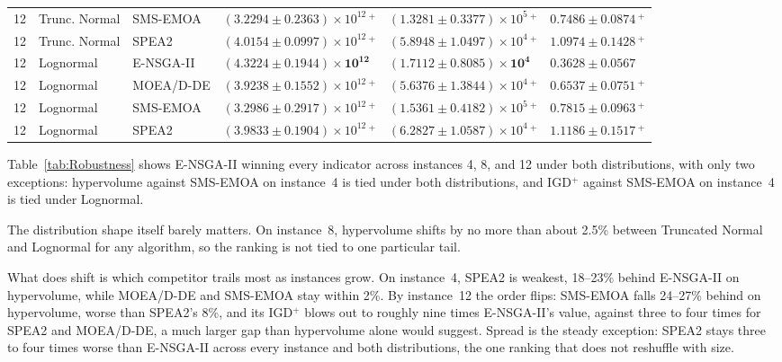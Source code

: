 \documentclass[11pt, a4paper]{article}
\begin{document}
\begin{table}[!htb]
{\begin{tabular}{@{}clllll@{}}
12 & Trunc. Normal & SMS-EMOA
& $(3.2294 \pm 0.2363)\times10^{12}\,{}^{+}$
& $(1.3281 \pm 0.3377)\times10^{5}\,{}^{+}$
& $0.7486 \pm 0.0874\,{}^{+}$ \\

12 & Trunc. Normal & SPEA2
& $(4.0154 \pm 0.0997)\times10^{12}\,{}^{+}$
& $(5.8948 \pm 1.0497)\times10^{4}\,{}^{+}$
& $1.0974 \pm 0.1428\,{}^{+}$ \\

\midrule

12 & Lognormal & E-NSGA-II
& $\mathbf{(4.3224 \pm 0.1944)\times10^{12}}$
& $\mathbf{(1.7112 \pm 0.8085)\times10^{4}}$
& $\mathbf{0.3628 \pm 0.0567}$ \\

12 & Lognormal & MOEA/D-DE
& $(3.9238 \pm 0.1552)\times10^{12}\,{}^{+}$
& $(5.6376 \pm 1.3844)\times10^{4}\,{}^{+}$
& $0.6537 \pm 0.0751\,{}^{+}$ \\

12 & Lognormal & SMS-EMOA
& $(3.2986 \pm 0.2917)\times10^{12}\,{}^{+}$
& $(1.5361 \pm 0.4182)\times10^{5}\,{}^{+}$
& $0.7815 \pm 0.0963\,{}^{+}$ \\

12 & Lognormal & SPEA2
& $(3.9833 \pm 0.1904)\times10^{12}\,{}^{+}$
& $(6.2827 \pm 1.0587)\times10^{4}\,{}^{+}$
& $1.1186 \pm 0.1517\,{}^{+}$ \\

\bottomrule
\end{tabular}%
}
\end{table}
Table~\ref{tab:Robustness} shows E-NSGA-II winning every indicator across instances 4, 8, and 12 under both distributions, with only two exceptions: hypervolume against SMS-EMOA on instance~4 is tied under both distributions, and IGD$^{+}$ against SMS-EMOA on instance~4 is tied under Lognormal.

The distribution shape itself barely matters. On instance~8, hypervolume shifts by no more than about 2.5\% between Truncated Normal and Lognormal for any algorithm, so the ranking is not tied to one particular tail.

What does shift is which competitor trails most as instances grow. On instance~4, SPEA2 is weakest, 18--23\% behind E-NSGA-II on hypervolume, while MOEA/D-DE and SMS-EMOA stay within 2\%. By instance~12 the order flips: SMS-EMOA falls 24--27\% behind on hypervolume, worse than SPEA2's 8\%, and its IGD$^{+}$ blows out to roughly nine times E-NSGA-II's value, against three to four times for SPEA2 and MOEA/D-DE, a much larger gap than hypervolume alone would suggest. Spread is the steady exception: SPEA2 stays three to four times worse than E-NSGA-II across every instance and both distributions, the one ranking that does not reshuffle with size.
\end{document}
